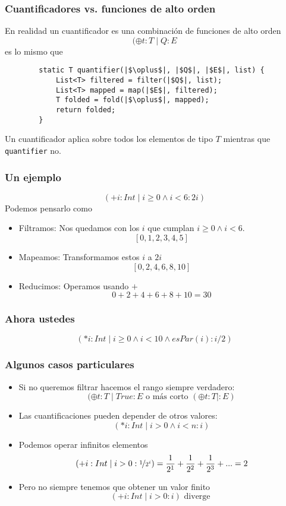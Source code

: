 \documentclass{beamer}
\begin{document}
\begin{frame}[fragile]
    \frametitle{Cuantificadores vs. funciones de alto orden}
    En realidad un cuantificador es una combinación de funciones de alto orden
        $$(\oplus t:T \mid Q:E$$
    es lo mismo que
    \begin{verbatim}
        static T quantifier(|$\oplus$|, |$Q$|, |$E$|, list) {
            List<T> filtered = filter(|$Q$|, list);
            List<T> mapped = map(|$E$|, filtered);
            T folded = fold(|$\oplus$|, mapped);
            return folded;
        } 
    \end{verbatim}
    Un cuantificador aplica sobre todos los elementos de tipo $T$  mientras que \verb|quantifier| no.
\end{frame}

\begin{frame}[fragile]
    \frametitle{Un ejemplo}
    $$(+ i:Int \mid i \geq 0 \land i < 6: 2i)$$
    Podemos pensarlo como
    \begin{itemize}
        \item Filtramos: Nos quedamos con los $i$ que cumplan $i \geq 0 \land i < 6$.
            $$[0, 1, 2, 3, 4, 5]$$
        \item Mapeamos: Transformamos estos $i$ a $2i$
            $$[0, 2, 4, 6, 8, 10]$$
        \item Reducimos: Operamos usando $+$
            $$0 + 2 + 4 + 6 + 8 + 10 = 30$$
    \end{itemize}
\end{frame}

\begin{frame}[fragile]
    \frametitle{Ahora ustedes}
    $$(* i:Int \mid i \geq 0 \land i < 10 \land esPar(i): i/2)$$
    \vspace*{165 pt}
\end{frame}

\begin{frame}[fragile]  
    \frametitle{Algunos casos particulares}
    \begin{itemize}
    \item Si no queremos filtrar hacemos el rango siempre verdadero:
        $$(\oplus t:T \mid True:E\text{ o más corto }(\oplus t:T \mid:E)$$
    \item Las cuantificaciones pueden depender de otros valores:
        $$(* i:Int \mid i>0 \land i < n :i)$$
    \item Podemos operar infinitos elementos
        $$(+ i:Int \mid i > 0:\nicefrac{1}{2^{i}}) = \frac{1}{2^{1}} + \frac{1}{2^{2}} + \frac{1}{2^{3}} + ... = 2$$
    \item Pero no siempre tenemos que obtener un valor finito
        $$(+ i:Int \mid i > 0: i) \text{ diverge }$$
    \end{itemize}
\end{frame}
\end{document}
